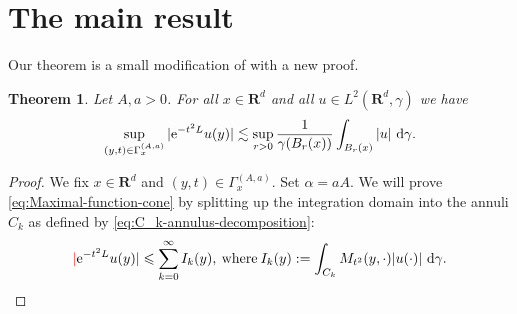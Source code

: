 \documentclass{amsart}
\newtheorem{theorem}{Theorem}
\theoremstyle{remark}
\newcommand{\D}{\,\textup{d}}
\newcommand{\LHG}{{L^2(\R^d,\gamma)}}
\renewcommand{\leq}{\leqslant}
\renewcommand{\leq}{\leqslant}
\newcommand{\R}{\mathbf R}
\newcommand{\e}{\mathrm{e}} %
\renewcommand{\leq}{\leqslant}%
\newcommand{\red}{\color{red}}
\begin{document}
\section{The main result}
Our theorem is a small modification of \cite[lemma 1.1]{Pineda2008} with a new proof.
\begin{theorem}\label{thm:Gaussian-maximal-function}
  Let $A, a > 0$. For all $x\in \R^d$ and all $u \in \LHG$ we have
  \begin{equation}
    \label{eq:Maximal-function-cone}
    \sup_{(y, t) \in \Gamma_x^{(A, a)}} |\e^{-t^2 L} u(y)| \lesssim
    \sup_{r > 0} \frac1{\gamma(B_r(x))}\int_{B_r(x)} |u| \, \D\gamma.
  \end{equation}
\end{theorem}
\begin{proof}
  We fix $x\in \R^d$ and $ (y, t) \in \Gamma_x^{(A, a)}$. 
  Set $\alpha = aA$. 
  We will prove \eqref{eq:Maximal-function-cone} by splitting up the
  integration domain into the annuli $C_k$ as defined by \eqref{eq:C_k-annulus-decomposition}:
  \begin{equation}\label{eq:Maximal-function-cone-intermediate-step-1}
    {\red |} \e^{-t^2 L} u(y)| \leq \sum_{k = 0}^\infty I_k(y),
    \:\text{where}\: I_k(y) := \int_{C_k} M_{t^2}(y, \cdot) |u(\cdot)|
    \,\D\gamma.
  \end{equation} 


\end{proof}
\end{document}

